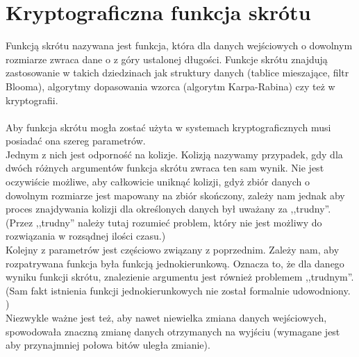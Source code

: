 \section{Kryptograficzna funkcja skrótu}
Funkcją skrótu nazywana jest funkcja, która dla danych wejściowych o dowolnym rozmiarze zwraca dane o z góry ustalonej długości. Funkcje skrótu znajdują zastosowanie w takich dziedzinach jak struktury danych (tablice mieszające, filtr Blooma), algorytmy dopasowania wzorca (algorytm Karpa-Rabina) czy też w kryptografii. \\ \\
Aby funkcja skrótu mogła zostać użyta w systemach kryptograficznych musi posiadać ona szereg parametrów. \\
Jednym z nich jest odporność na kolizje. Kolizją nazywamy przypadek, gdy dla dwóch różnych argumentów funkcja skrótu zwraca ten sam wynik. Nie jest oczywiście możliwe, aby całkowicie uniknąć kolizji, gdyż zbiór danych o dowolnym rozmiarze jest mapowany na zbiór skończony, zależy nam jednak aby proces znajdywania kolizji dla określonych danych był uważany za ,,trudny''. (Przez ,,trudny'' należy tutaj rozumieć problem, który nie jest możliwy do rozwiązania w rozsądnej ilości czasu.) \\
Kolejny z parametrów jest częściowo związany z poprzednim. Zależy nam, aby rozpatrywana funkcja była funkcją jednokierunkową. Oznacza to, że dla danego wyniku funkcji skrótu, znalezienie argumentu jest również problemem ,,trudnym''.
(Sam fakt istnienia funkcji jednokierunkowych nie został formalnie udowodniony. \cite{oneway}) \\
Niezwykle ważne jest też, aby nawet niewielka zmiana danych wejściowych, spowodowała znaczną zmianę danych otrzymanych na wyjściu (wymagane jest aby przynajmniej połowa bitów uległa zmianie).

